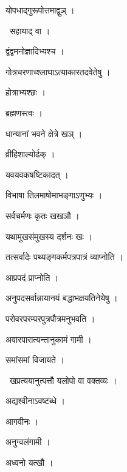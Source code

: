 \documentclass[10pt, openany, oneside]{book}
\begin{document}
\noindent योपधाद्गुरूपोत्तमाद्वुञ् ।

\par\noindent\hspace{1.5em}{\vps वा॰}~{\qt सहायाद् वा ।}

\noindent द्वंद्वमनोज्ञादिभ्यश्च ।

\noindent गोत्रचरणाच्श्लाघाऽत्याकारतदवेतेषु ।

\noindent होत्राभ्यश्छः ।

\noindent ब्रह्मणस्त्वः ।

\noindent धान्यानां भवने क्षेत्रे खञ् ।

\noindent व्रीहिशाल्योर्ढक् ।

\noindent यवयवकषष्टिकादत् ।

\noindent विभाषा तिलमाषोमाभङ्गाऽणुभ्यः ।

\noindent सर्वचर्मणः कृतः खखञौ ।

\noindent यथामुखसंमुखस्य दर्शनः खः ।

\noindent तत्सर्वादेः पथ्यङ्गकर्मपत्रपात्रं व्याप्नोति ।

\noindent आप्रपदं प्राप्नोति ।

\noindent अनुपदसर्वान्नायानयं बद्धाभक्षयतिनेयेषु ।

\noindent परोवरपरम्परपुत्रपौत्रमनुभवति ।

\noindent अवारपारात्यन्तानुकामं गामी ।

\noindent समांसमां विजायते ।

\par\noindent\hspace{1.5em}{\vps वा॰}~{\qt खप्रत्ययानुत्पत्तौ यलोपो वा वक्तव्यः ।}

\noindent अद्यश्वीनाऽवष्टब्धे ।

\noindent आगवीनः ।

\noindent अनुग्वलंगामी ।

\noindent अध्वनो यत्खौ ।
\end{document}
